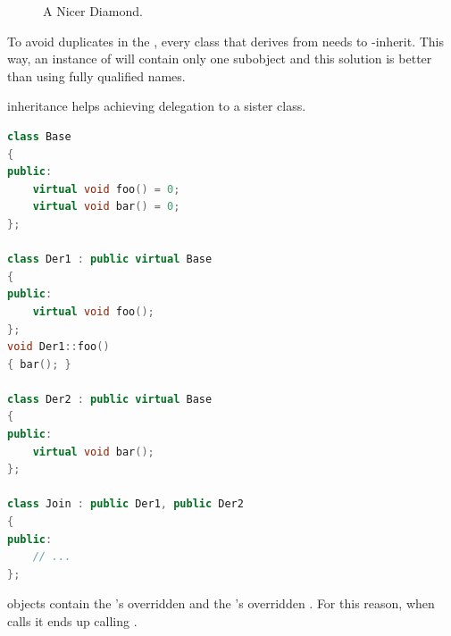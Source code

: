 \begin{figure}%
\begin{center}
    \caption{A Nicer Diamond.}
    \label{fig:undreaded-diamond}
\end{center}
\end{figure}%

To avoid duplicates in the , every class that 
derives from  needs to -inherit. 
This way, an instance of  will contain only one 
 subobject and this solution is better than using 
fully qualified names.

\clearpage
{}
 inheritance helps achieving delegation to a 
sister class.
\begin{lstlisting}[language=C++]
class Base
{
public:
    virtual void foo() = 0;
    virtual void bar() = 0;
};

class Der1 : public virtual Base
{
public:
    virtual void foo();
};
void Der1::foo()
{ bar(); }

class Der2 : public virtual Base
{
public:
    virtual void bar();
};

class Join : public Der1, public Der2
{
public:
    // ...
};
\end{lstlisting}
 objects contain the 's overridden 
 and the 's overridden 
. For this reason, when  
calls  it ends up calling 
.

